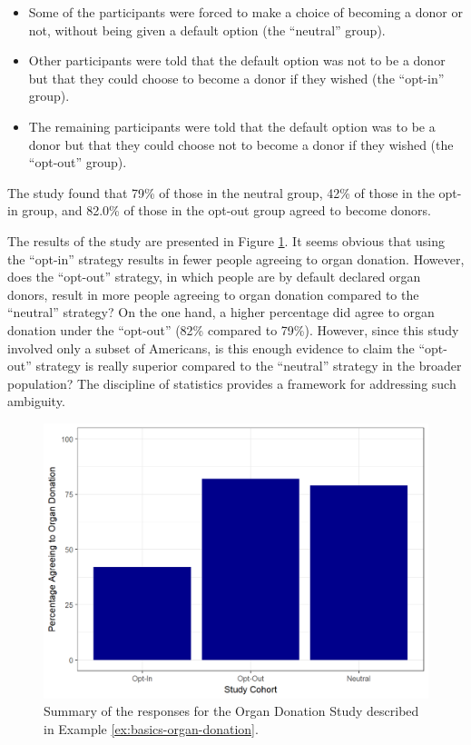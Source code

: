 \documentclass[]{book}
\providecommand{\tightlist}{%
  \setlength{\itemsep}{0pt}\setlength{\parskip}{0pt}}
\theoremstyle{plain}
\theoremstyle{mydefn}
\theoremstyle{myexmpl}
\theoremstyle{remark}
\begin{document}
\begin{itemize}
\tightlist
\item
  Some of the participants were forced to make a choice of becoming a
  donor or not, without being given a default option (the ``neutral''
  group).
\item
  Other participants were told that the default option was not to be a
  donor but that they could choose to become a donor if they wished (the
  ``opt-in'' group).
\item
  The remaining participants were told that the default option was to be
  a donor but that they could choose not to become a donor if they
  wished (the ``opt-out'' group).
\end{itemize}

The study found that 79\% of those in the neutral group, 42\% of those
in the opt-in group, and 82.0\% of those in the opt-out group agreed to
become donors.

The results of the study are presented in Figure
\ref{fig:basics-organ-plot}. It seems obvious that using the ``opt-in''
strategy results in fewer people agreeing to organ donation. However,
does the ``opt-out'' strategy, in which people are by default declared
organ donors, result in more people agreeing to organ donation compared
to the ``neutral'' strategy? On the one hand, a higher percentage did
agree to organ donation under the ``opt-out'' (82\% compared to 79\%).
However, since this study involved only a subset of Americans, is this
enough evidence to claim the ``opt-out'' strategy is really superior
compared to the ``neutral'' strategy in the broader population? The
discipline of statistics provides a framework for addressing such
ambiguity.




\begin{figure}

{\centering \includegraphics[width=0.8\linewidth]{./Images/basics-organ-plot-1} 

}

\caption{Summary of the responses for the Organ
Donation Study described in Example \ref{ex:basics-organ-donation}.}\label{fig:basics-organ-plot}
\end{figure}
\end{document}
